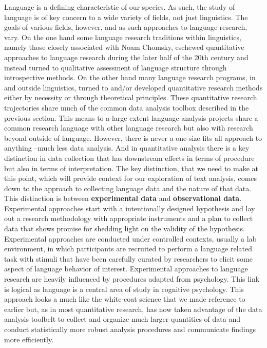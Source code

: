 \documentclass[
  letterpaper,
]{scrbook}
\begin{document}
Language is a defining characteristic of our species. As such, the study
of language is of key concern to a wide variety of fields, not just
linguistics. The goals of various fields, however, and as such
approaches to language research, vary. On the one hand some language
research traditions within linguistics, namely those closely associated
with Noam Chomsky, eschewed quantitative approaches to language research
during the later half of the 20th century and instead turned to
qualitative assessment of language structure through introspective
methods. On the other hand many language research programs, in and
outside linguistics, turned to and/or developed quantitative research
methods either by necessity or through theoretical principles. These
quantitative research trajectories share much of the common data
analysis toolbox described in the previous section. This means to a
large extent language analysis projects share a common research language
with other language research but also with research beyond outside of
language. However, there is never a one-size-fits all approach to
anything --much less data analysis. And in quantitative analysis there
is a key distinction in data collection that has downstream effects in
terms of procedure but also in terms of interpretation. The key
distinction, that we need to make at this point, which will provide
context for our exploration of text analysis, comes down to the approach
to collecting language data and the nature of that data. This
distinction is between \textbf{experimental
data} and \textbf{observational
data}. Experimental approaches start with a
intentionally designed hypothesis and lay out a research methodology
with appropriate instruments and a plan to collect data that shows
promise for shedding light on the validity of the hypothesis.
Experimental approaches are conducted under controlled contexts, usually
a lab environment, in which participants are recruited to perform a
language related task with stimuli that have been carefully curated by
researchers to elicit some aspect of language behavior of interest.
Experimental approaches to language research are heavily influenced by
procedures adapted from psychology. This link is logical as language is
a central area of study in cognitive psychology. This approach looks a
much like the white-coat science that we made reference to earlier but,
as in most quantitative research, has now taken advantage of the data
analysis toolbelt to collect and organize much larger quantities of data
and conduct statistically more robust analysis procedures and
communicate findings more efficiently.
\end{document}
